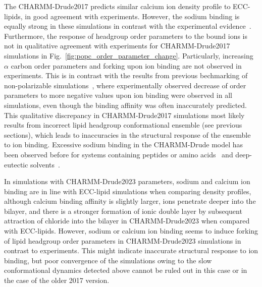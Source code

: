 \documentclass[journal=jacsat,manuscript=article,layout=singlecolumn]{achemso}
\begin{document}
The CHARMM-Drude2017 predicts similar calcium ion density profile to ECC-lipids, in good agreement with experiments. However, the sodium binding is equally strong in these simulations in contrast with the experimental evidence~\cite{Catte2016}. 
Furthermore, the response of headgroup order parameters to the bound ions is not in qualitative agreement with experiments for CHARMM-Drude2017 simulations in Fig.~\ref{fig:popc_order_parameter_change}. Particularly, increasing $\alpha$ carbon order parameters and forking upon ion binding are not observed in experiments. This is in contrast with the results from previous bechmarking of non-polarizable simulations~\cite{Catte2016}, where experimentally observed decrease of order parameters to more negative values upon ion binding were observed in all simulations, even though the binding affinity was often inaccurately predicted. This qualitative discrepancy in CHARMM-Drude2017 simulations most likely results from incorrect lipid headgroup conformational ensemble (see previous sections), which leads to inaccuracies in the structural response of the ensemble to ion binding. 
Excessive sodium binding in the CHARMM-Drude model has been observed before for systems containing peptides or amino acids~\cite{Ngo2019, Kav2022} and deep-eutectic solvents~\cite{shayestehpour2022ion}. %

In simulations with CHARMM-Drude2023 parameters, sodium and calcium ion binding are in line with ECC-lipid simulations when comparing density profiles, although calcium binding affinity is slightly larger, ions penetrate deeper into the bilayer, and there is a stronger formation of ionic double layer by subsequent attraction of chloride into the bilayer in CHARMM-Drude2023 when compared with ECC-lipids.  
However, sodium or calcium ion binding seems to induce forking of lipid headgroup order parameters in CHARMM-Drude2023 simulations in contrast to experiments. 
This might indicate inaccurate structural response to ion binding, but poor convergence of the simulations owing to the slow conformational dynamics detected above cannot be ruled out in this case or in the case of the older 2017 version.
%
\end{document}

